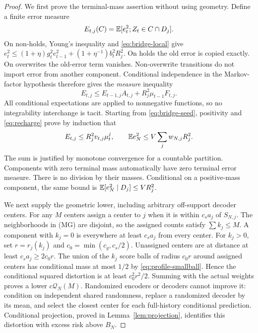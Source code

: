 \begin{proof}
We first prove the terminal-mass assertion without using geometry. Define a finite error measure
\[
 E_{t,j}(C)=\mathbb E[e_t^2;Z_t\in C\cap D_j].
\]
On non-holds, Young's inequality and \eqref{eq:bridge-local} give
$e_t^2\le(1+\eta)g_t^2e_{t-1}^2+(1+\eta^{-1})b_t^2R_j^2$.
On holds the old error is copied exactly. On overwrites the old-error term vanishes. Non-overwrite transitions do not import error from another component. Conditional independence in the Markov-factor hypothesis therefore gives the \emph{measure} inequality
\begin{equation}\label{eq:error-measure-step}
 E_{t,j}\le E_{t-1,j}A_{t,j}+R_j^2\mu_{t-1}F_{t,j}.
\end{equation}
All conditional expectations are applied to nonnegative functions, so no integrability interchange is tacit. Starting from \eqref{eq:bridge-seed}, positivity and \eqref{eq:recharge} prove by induction that
\begin{equation}\label{eq:terminal-conditional}
 E_{t,j}\le R_j^2 v_{t,j}\mu_t^j,\qquad
 \mathbb E e_N^2\le V\sum_jw_{N,j}R_j^2.
\end{equation}
The sum is justified by monotone convergence for a countable partition. Components with zero terminal mass automatically have zero terminal error measure. There is no division by their masses. Conditional on a positive-mass component, the same bound is $\mathbb E[e_N^2\mid D_j]\le V R_j^2$.

We next supply the geometric lower, including arbitrary off-support decoder centers. For any $M$ centers assign a center to $j$ when it is within $c_s a_j$ of $S_{N,j}$. The neighborhoods in \textup{(MG)} are disjoint, so the assigned counts satisfy $\sum k_j\le M$. A component with $k_j=0$ is everywhere at least $c_s a_j$ from every center. For $k_j>0$, set $r=r_j(k_j)$ and $c_0=\min(c_g,c_s/2)$. Unassigned centers are at distance at least $c_s a_j\ge 2c_0r$. The union of the $k_j$ score balls of radius $c_0r$ around assigned centers has conditional mass at most $1/2$ by \eqref{eq:profile-smallball}. Hence the conditional squared distortion is at least $c_0^2r^2/2$. Summing with the actual weights proves a lower $c\mathcal Q_N(M)$. Randomized encoders or decoders cannot improve it: condition on independent shared randomness, replace a randomized decoder by its mean, and select the closest center for each full-history conditional prediction. Conditional projection, proved in Lemma~\ref{lem:projection}, identifies this distortion with excess risk above $B_N$.


\end{proof}
